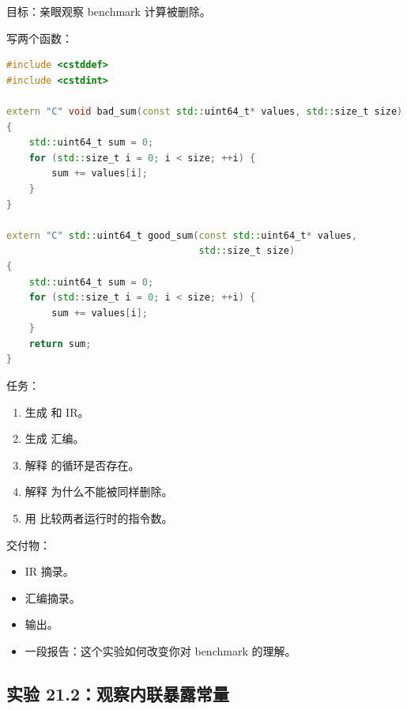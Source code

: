 \begin{labbox}
目标：亲眼观察 benchmark 计算被删除。

写两个函数：

\begin{lstlisting}[language=C++]
#include <cstddef>
#include <cstdint>

extern "C" void bad_sum(const std::uint64_t* values, std::size_t size)
{
    std::uint64_t sum = 0;
    for (std::size_t i = 0; i < size; ++i) {
        sum += values[i];
    }
}

extern "C" std::uint64_t good_sum(const std::uint64_t* values,
                                  std::size_t size)
{
    std::uint64_t sum = 0;
    for (std::size_t i = 0; i < size; ++i) {
        sum += values[i];
    }
    return sum;
}
\end{lstlisting}

任务：

\begin{enumerate}
  \item 生成  和  IR。
  \item 生成  汇编。
  \item 解释  的循环是否存在。
  \item 解释  为什么不能被同样删除。
  \item 用  比较两者运行时的指令数。
\end{enumerate}

交付物：

\begin{itemize}
  \item IR 摘录。
  \item 汇编摘录。
  \item {} 输出。
  \item 一段报告：这个实验如何改变你对 benchmark 的理解。
\end{itemize}
\end{labbox}

\subsection{实验 21.2：观察内联暴露常量}

